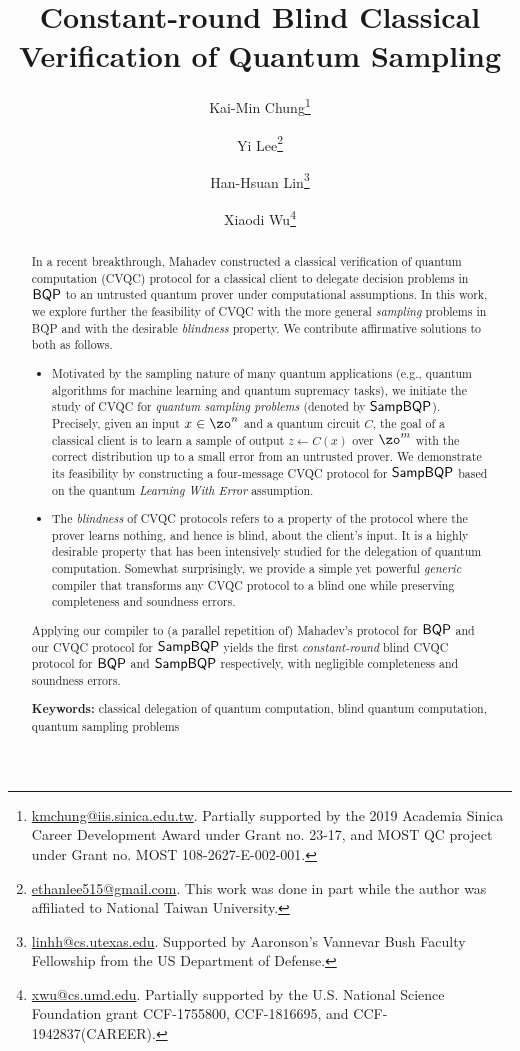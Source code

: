 \documentclass[11pt]{article}
\title{Constant-round Blind Classical Verification of Quantum Sampling}
\author[1]{Kai-Min Chung\thanks{\href{mailto:kmchung@iis.sinica.edu.tw}{kmchung@iis.sinica.edu.tw}. Partially supported by the 2019 Academia Sinica Career Development Award under Grant no. 23-17, and MOST QC project under Grant no. MOST 108-2627-E-002-001.}}
\author[2]{Yi Lee\thanks{\href{mailto:ethanlee515@gmail.com}{ethanlee515@gmail.com}. This work was done in part while the author was affiliated to National Taiwan University.}}
\author[3]{Han-Hsuan Lin\thanks{\href{mailto:linhh@cs.utexas.edu}{linhh@cs.utexas.edu}. Supported by Aaronson's Vannevar Bush Faculty Fellowship from the US Department of Defense.}}
\author[4]{Xiaodi Wu\thanks{\href{mailto:xwu@cs.umd.edu}{xwu@cs.umd.edu}. Partially supported by the U.S. National Science Foundation grant CCF-1755800, CCF-1816695, and CCF-1942837(CAREER).}}
\affil[1, 2]{Institute of Information Science, Academia Sinica, Taiwan}
\affil[3]{Department of Computer Science, University of Texas at Austin, USA}
\affil[4]{
	Department of Computer Science, Institute for Advanced Computer Studies,
	and Joint Center for Quantum Information and Computer Science,
	University of Maryland, USA
}
\numberwithin{equation}{section}
\newcounter{protocol}
\begin{document}
\maketitle

\begin{abstract}

In a recent breakthrough, Mahadev constructed a classical verification of quantum computation (CVQC) protocol for a  classical client to delegate decision problems in $\operatorname{\mathsf{BQP}}$ to an untrusted quantum prover under computational assumptions. In this work, we explore further the feasibility of CVQC with the more general \emph{sampling} problems in BQP and with the desirable \emph{blindness} property. We contribute affirmative solutions to both as follows. 
\begin{itemize}
\item Motivated by the sampling nature of many quantum applications (e.g., quantum algorithms for machine learning and quantum supremacy tasks), we initiate the study of  CVQC for \emph{quantum sampling problems} (denoted by $\operatorname{\mathsf{SampBQP}}$).  Precisely, given an input $x\in \zo^n$ and a quantum circuit $C$, the goal of a classical client is to learn a sample of output $z \leftarrow C(x)$ over $\zo^m$ with the correct distribution up to a small error from an untrusted prover. We demonstrate its feasibility by constructing a four-message CVQC protocol for $\operatorname{\mathsf{SampBQP}}$ based on the quantum \emph{Learning With Error} assumption.
\item
The \emph{blindness} of CVQC protocols refers to a property of the protocol where the prover learns nothing, and hence is blind, about the client's input. It is a highly desirable property that has been intensively studied for the delegation of quantum computation. 
Somewhat surprisingly, we provide a simple yet powerful \emph{generic} compiler that transforms any CVQC protocol to a blind one while preserving completeness and soundness errors.  
\end{itemize}
Applying our compiler to (a parallel repetition of) Mahadev's protocol for $\operatorname{\mathsf{BQP}}$ and our CVQC protocol for $\operatorname{\mathsf{SampBQP}}$ yields the first \emph{constant-round} blind CVQC protocol for $\operatorname{\mathsf{BQP}}$ and $\operatorname{\mathsf{SampBQP}}$ respectively, with negligible completeness and soundness errors.

\vspace{1mm}
\noindent \textbf{Keywords:} classical delegation of quantum computation, blind quantum computation, quantum sampling problems

\iffalse


\end{abstract}
\end{document}
